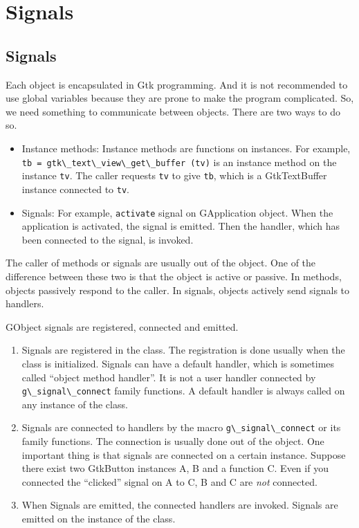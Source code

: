 \section{Signals}\label{signals}

\subsection{Signals}\label{signals-1}

Each object is encapsulated in Gtk programming. And it is not
recommended to use global variables because they are prone to make the
program complicated. So, we need something to communicate between
objects. There are two ways to do so.

\begin{itemize}
\tightlist
\item
  Instance methods: Instance methods are functions on instances. For
  example,
  \passthrough{\lstinline!tb = gtk\_text\_view\_get\_buffer (tv)!} is an
  instance method on the instance \passthrough{\lstinline!tv!}. The
  caller requests \passthrough{\lstinline!tv!} to give
  \passthrough{\lstinline!tb!}, which is a GtkTextBuffer instance
  connected to \passthrough{\lstinline!tv!}.
\item
  Signals: For example, \passthrough{\lstinline!activate!} signal on
  GApplication object. When the application is activated, the signal is
  emitted. Then the handler, which has been connected to the signal, is
  invoked.
\end{itemize}

The caller of methods or signals are usually out of the object. One of
the difference between these two is that the object is active or
passive. In methods, objects passively respond to the caller. In
signals, objects actively send signals to handlers.

GObject signals are registered, connected and emitted.

\begin{enumerate}
\def\labelenumi{\arabic{enumi}.}
\tightlist
\item
  Signals are registered in the class. The registration is done usually
  when the class is initialized. Signals can have a default handler,
  which is sometimes called ``object method handler''. It is not a user
  handler connected by \passthrough{\lstinline!g\_signal\_connect!}
  family functions. A default handler is always called on any instance
  of the class.
\item
  Signals are connected to handlers by the macro
  \passthrough{\lstinline!g\_signal\_connect!} or its family functions.
  The connection is usually done out of the object. One important thing
  is that signals are connected on a certain instance. Suppose there
  exist two GtkButton instances A, B and a function C. Even if you
  connected the ``clicked'' signal on A to C, B and C are \emph{not}
  connected.
\item
  When Signals are emitted, the connected handlers are invoked. Signals
  are emitted on the instance of the class.
\end{enumerate}

